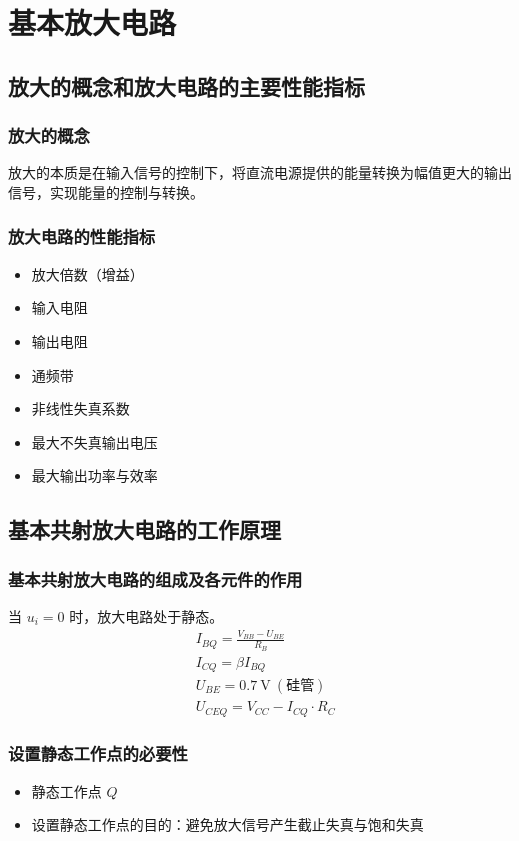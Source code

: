 \chapter{基本放大电路}

\section{放大的概念和放大电路的主要性能指标}
\subsection{放大的概念}
放大的本质是在输入信号的控制下，将直流电源提供的能量转换为幅值更大的输出信号，实现能量的控制与转换。

\subsection{放大电路的性能指标}
\begin{itemize}
    \item 放大倍数（增益）
    \item 输入电阻
    \item 输出电阻
    \item 通频带
    \item 非线性失真系数
    \item 最大不失真输出电压
    \item 最大输出功率与效率
\end{itemize}

\section{基本共射放大电路的工作原理}
\subsection{基本共射放大电路的组成及各元件的作用}
当 \(u_i=0\) 时，放大电路处于静态。
\[
\begin{aligned}
&I_{BQ} = \frac{V_{BB} - U_{BE}}{R_B} \\
&I_{CQ} = \beta I_{BQ} \\
&U_{BE} = 0.7\ \text{V}\ (\text{硅管}) \\
&U_{CEQ} = V_{CC} - I_{CQ} \cdot R_C
\end{aligned}
\]

\subsection{设置静态工作点的必要性}
\begin{itemize}
    \item 静态工作点 \(Q\)
    \item 设置静态工作点的目的：避免放大信号产生截止失真与饱和失真
\end{itemize}

